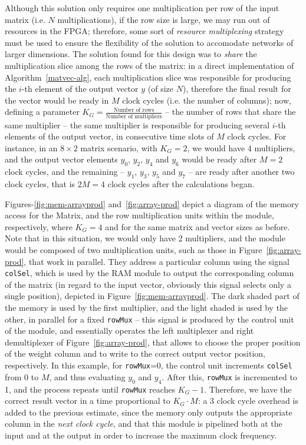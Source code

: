 \documentclass{IEEEtran}
\begin{document}
Although this solution only requires one multiplication per row of the input matrix (i.e. $N$ multiplications), if the row
size is large, we may run out of resources in the FPGA; therefore, some sort of \textit{resource multiplexing} strategy must
be used to ensure the flexibility of the solution to accomodate networks of larger dimensions. The solution found for this
design was to \emph{share} the multiplication slice among the rows of the matrix: in a direct implementation of Algorithm~\ref{matvec-alg},
each multiplication slice was responsible for producing the $i$-th element of the output vector $y$ (of size $N$), therefore the final
result for the vector would be ready in $M$ clock cycles (i.e. the number of columns); now, defining a
parameter $K_G = \frac{\text{Number of rows}}{\text{Number of multipliers}}$ -- the number of rows that share the same multiplier -- the
same multiplier is responsible for producing several $i$-th elements of the output vector, in consecutive time slots of $M$ clock cycles.
For instance, in an $8\times2$ matrix scenario, with $K_G = 2$, we would have 4 multipliers, and the output vector
elements $y_0$, $y_2$, $y_4$ and $y_6$ would be ready after $M=2$ clock cycles, and the remaining -- $y_1$, $y_3$, $y_5$ and $y_7$ --  are
ready after another two clock cycles, that is $2M = 4$ clock cycles after the calculations began.

Figures-\ref{fig:mem-arrayprod} and~\ref{fig:array-prod} depict a diagram of the memory access for the Matrix, and the row multiplication
units within the module, respectively, where $K_G = 4$ and for the same matrix and vector sizes as before. Note that in this situation,
we would only have 2 multipliers, and the module would be composed of two multiplication units, such as those in Figure~\ref{fig:array-prod},
that work in parallel. They address a particular column using the signal \verb+colSel+, which is used by the RAM module to output the corresponding
column of the matrix (in regard to the input vector, obviously this signal selects only a single position), depicted in Figure~\ref{fig:mem-arrayprod}.
The dark shaded part of the memory is used by the first multiplier, and the light shaded is used by the other, in parallel for a
fixed \verb+rowMux+ -- this signal is produced by the control unit of the module, and essentially operates the left multiplexer and right demultiplexer
of Figure~\ref{fig:array-prod}, that allows to choose the proper position of the weight column and to write to the correct output vector position, respectively.
In this example, for \verb+rowMux+=0, the control unit increments \verb+colSel+ from 0 to $M$, and thus evaluating $y_0$ and $y_4$. After this, \verb+rowMux+
is incremented to 1, and the process repeats until \verb+rowMux+ reaches $K_G-1$. Therefore, we have the correct result vector in a time
proportional to $K_G \cdot M$: a 3 clock cycle overhead is added to the previous estimate, since the memory only outputs the appropriate column
in the \emph{next clock cycle}, and that this module is pipelined both at the input and at the output in order to increase the maximum clock frequency.
\end{document}

